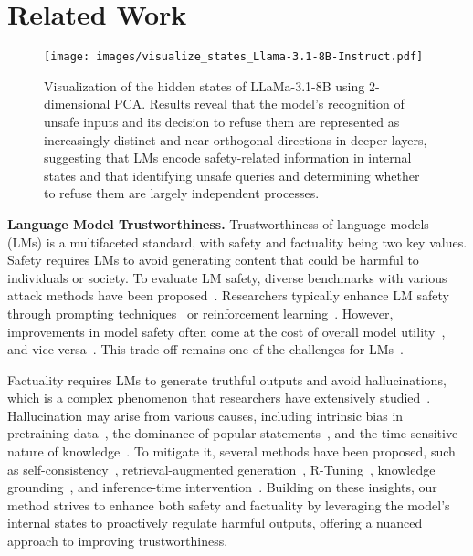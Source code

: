 \section{Related Work}

\begin{figure*}[htbp]
    \centering
    \texttt{[image: images/visualize\_states\_Llama-3.1-8B-Instruct.pdf]}
    \caption{Visualization of the hidden states of LLaMa-3.1-8B using 2-dimensional PCA. Results reveal that the model’s recognition of unsafe inputs and its decision to refuse them are represented as increasingly distinct and near-orthogonal directions in deeper layers, suggesting that LMs encode safety-related information in internal states and that identifying unsafe queries and determining whether to refuse them are largely independent processes.}
    \label{fig:visual_states}
\end{figure*}

\textbf{Language Model Trustworthiness.} Trustworthiness of language models (LMs) \cite{huang2024trustllm} is a multifaceted standard, with safety and factuality being two key values. Safety requires LMs to avoid generating content that could be harmful to individuals or society. To evaluate LM safety, diverse benchmarks with various attack methods have been proposed~\cite{wang2023not,xie2024sorry,shen2024anything,kumar2023certifying}. Researchers typically enhance LM safety through prompting techniques~\cite{chen2024iteralign,zheng2024prompt} or reinforcement learning~\cite{ouyang2022training,bai2022training,mu2024rule,gibbs2024,rlhf2024b,selfimprovement2024a}. However, improvements in model safety often come at the cost of overall model utility~\cite{lin2024mitigating,arditi2024refusal}, and vice versa~\cite{qi2023fine}. This trade-off remains one of the challenges for LMs~\cite{wolf2024tradeoffs,arditi2024refusal}.

Factuality requires LMs to generate truthful outputs and avoid hallucinations, which is a complex phenomenon that researchers have extensively studied~\cite{zhang2023siren}. Hallucination may arise from various causes, including intrinsic bias in pretraining data~\cite{dziri2022origin}, the dominance of popular statements~\cite{zhang2024knowledge}, and the time-sensitive nature of knowledge~\cite{luu2021time}. To mitigate it, several methods have been proposed, such as self-consistency~\cite{wang2022self}, retrieval-augmented generation~\cite{gao2023retrieval,han2023distributionally}, R-Tuning~\cite{zhang2023r}, knowledge grounding~\cite{smartbook2024}, and inference-time intervention~\cite{li2024inference}. Building on these insights, our method strives to enhance both safety and factuality by leveraging the model’s internal states to proactively regulate harmful outputs, offering a nuanced approach to improving trustworthiness.






